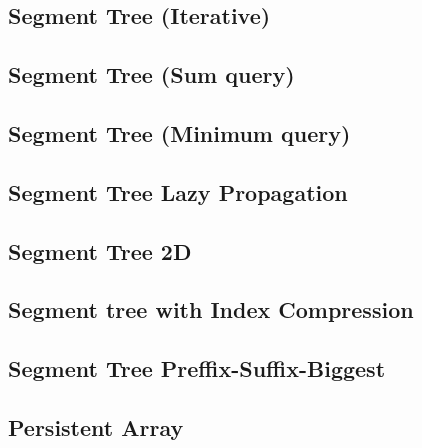 \documentclass[10pt]{article}
\begin{document}
\begin{multicols*}{2}
\subsection{Segment Tree (Iterative)}


\subsection{Segment Tree (Sum query)}


\subsection{Segment Tree (Minimum query)}


\subsection{Segment Tree Lazy Propagation}


\subsection{Segment Tree 2D}


\subsection{Segment tree with Index Compression}


\subsection{Segment Tree Preffix-Suffix-Biggest}


\subsection{Persistent Array}




\end{multicols*}
\end{document}
